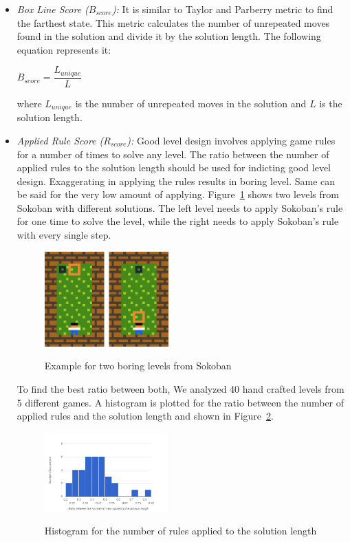 \documentclass[letterpaper]{article}
\newcommand{\figref}[1]{Figure~\ref{Figure:#1}}
\begin{document}
\begin{itemize}
	\item \emph{Box Line Score ($B_{score}$):} It is similar to Taylor and Parberry\cite{sokobanLevelGenerationNew} metric to find the farthest state. This metric calculates the number of unrepeated moves found in the solution and divide it by the solution length. The following equation represents it:
	\begin{center}$B_{score} = \dfrac{L_{unique}}{L}$\end{center}
	where $L_{unique}$ is the number of unrepeated moves in the solution and $L$ is the solution length.
	
	\item \emph{Applied Rule Score ($R_{score}$):} Good level design involves applying game rules for a number of times to solve any level. The ratio between the number of applied rules to the solution length should be used for indicting good level design. Exaggerating in applying the rules results in boring level. Same can be said for the very low amount of applying. \figref{sokobanRuleScore} shows two levels from Sokoban with different solutions. The left level needs to apply Sokoban's rule for one time to solve the level, while the right needs to apply Sokoban's rule with every single step.
	
	\begin{figure}
		\centering
		\includegraphics[width=0.45\textwidth]{Images/sokobanRuleScore}
		\label{Figure:sokobanRuleScore}
		\caption{Example for two boring levels from Sokoban}
	\end{figure}
	
	To find the best ratio between both, We analyzed 40 hand crafted levels from 5 different games. A histogram is plotted for the ratio between the number of applied rules and the solution length and shown in \figref{rulesSolutionLengthHistogram}.
	
	\begin{figure}
		\centering
		\includegraphics[width=0.45\textwidth]{Images/rulesSolutionLengthHistogram}
		\label{Figure:rulesSolutionLengthHistogram}
		\caption{Histogram for the number of rules applied to the solution length}
	\end{figure}
	

\end{itemize}
\end{document}
